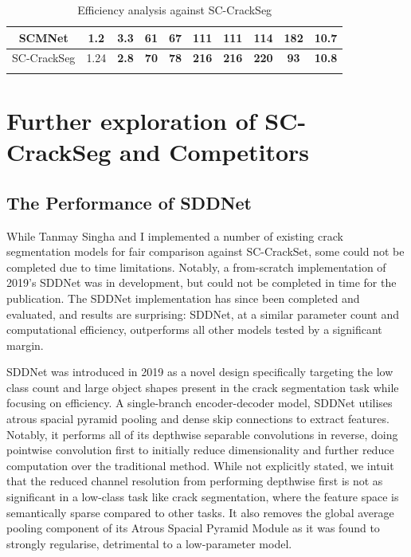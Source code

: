 \documentclass[a4paper,12pt]{report}
\begin{document}
\begin{table}
\begin{adjustbox}{width=\columnwidth,center}
\begin{tabular}{|c|c|c|c|c|c|c|c|c|c|}
            \hline
            {SCMNet}      & \textbf{1.2} & {3.3}        & {61}                                                           & {67}        & {111}        & {111}        & {114}        & {182}                            & {10.7}        \\
            \hline
            {SC-CrackSeg} & {1.24}       & \textbf{2.8} & \textbf{70}                                                    & \textbf{78} & \textbf{216} & \textbf{216} & \textbf{220} & \textbf{93}                      & \textbf{10.8} \\
            \hline
            \multicolumn{10}{l}{}
        \end{tabular}
    \end{adjustbox}
    \caption{Efficiency analysis against SC-CrackSeg}
    \label{tab:sc-crackseg-initial-efficiency-comparison}
\end{table}


\section{Further exploration of SC-CrackSeg and Competitors}
\subsection{The Performance of SDDNet}
While Tanmay Singha and I implemented a number of existing crack segmentation models for fair comparison against SC-CrackSet, some could not be completed due to time limitations. Notably, a from-scratch implementation of 2019's SDDNet \cite{choi_sddnet_2019} was in development, but could not be completed in time for the publication. The SDDNet implementation has since been completed and evaluated, and results are surprising: SDDNet, at a similar parameter count and computational efficiency, outperforms all other models tested by a significant margin.

SDDNet was introduced in 2019 as a novel design specifically targeting the low class count and large object shapes present in the crack segmentation task while focusing on efficiency. A single-branch encoder-decoder model, SDDNet utilises atrous spacial pyramid pooling and dense skip connections to extract features. Notably, it performs all of its depthwise separable convolutions in reverse, doing pointwise convolution first to initially reduce dimensionality and further reduce computation over the traditional method. While not explicitly stated, we intuit that the reduced channel resolution from performing depthwise first is not as significant in a low-class task like crack segmentation, where the feature space is semantically sparse compared to other tasks. It also removes the global average pooling component of its Atrous Spacial Pyramid Module as it was found to strongly regularise, detrimental to a low-parameter model.
\end{document}
